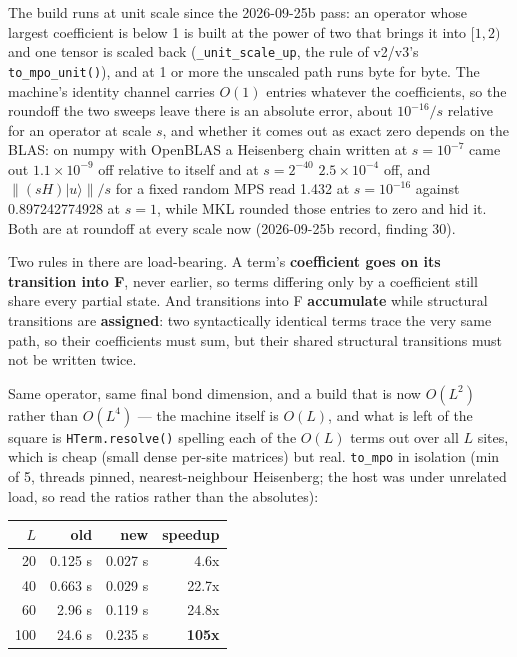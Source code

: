 \documentclass[11pt]{article}
\begin{document}
The build runs at unit scale since the 2026-09-25b pass: an operator whose
largest coefficient is below 1 is built at the power of two that brings it
into $[1,2)$ and one tensor is scaled back (\texttt{\_unit\_scale\_up},
the rule of v2/v3's \texttt{to\_mpo\_unit()}), and at 1 or more the
unscaled path runs byte for byte. The machine's identity channel carries
$O(1)$ entries whatever the coefficients, so the roundoff the two sweeps
leave there is an absolute error, about $10^{-16}/s$ relative for an
operator at scale $s$, and whether it comes out as exact zero depends on
the BLAS: on numpy with OpenBLAS a Heisenberg chain written at
$s=10^{-7}$ came out $1.1\times10^{-9}$ off relative to itself and at
$s=2^{-40}$ $2.5\times10^{-4}$ off, and $\lVert(sH)|u\rangle\rVert/s$ for
a fixed random MPS read 1.432 at $s=10^{-16}$ against 0.897242774928 at
$s=1$, while MKL rounded those entries to zero and hid it. Both are at
roundoff at every scale now (2026-09-25b record, finding 30).

Two rules in there are load-bearing. A term's \textbf{coefficient goes on
its transition into F}, never earlier, so terms differing only by a
coefficient still share every partial state. And transitions into F
\textbf{accumulate} while structural transitions are \textbf{assigned}:
two syntactically identical terms trace the very same path, so their
coefficients must sum, but their shared structural transitions must not be
written twice.

Same operator, same final bond dimension, and a build that is now
$O(L^2)$ rather than $O(L^4)$ --- the machine itself is $O(L)$, and what
is left of the square is \texttt{HTerm.resolve()} spelling each of the
$O(L)$ terms out over all $L$ sites, which is cheap (small dense per-site
matrices) but real. \texttt{to\_mpo} in isolation (min of 5, threads
pinned, nearest-neighbour Heisenberg; the host was under unrelated load,
so read the ratios rather than the absolutes):

\begin{center}
\begin{tabular}{@{}rrrr@{}}
\toprule
$L$ & old & new & speedup \\
\midrule
20 & 0.125 s & 0.027 s & 4.6x \\
40 & 0.663 s & 0.029 s & 22.7x \\
60 & 2.96 s & 0.119 s & 24.8x \\
100 & 24.6 s & 0.235 s & \textbf{105x} \\
\bottomrule
\end{tabular}
\end{center}
\end{document}
